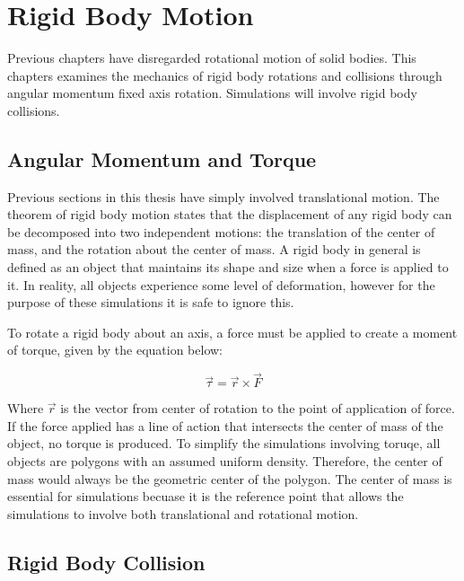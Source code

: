 
\chapter{Rigid Body Motion} %

\label{Chapter3} %



Previous chapters have disregarded rotational motion of solid bodies.  This chapters examines the mechanics of rigid body rotations and collisions through angular momentum fixed axis rotation.  Simulations will involve rigid body collisions.


\section{Angular Momentum and Torque}

Previous sections in this thesis have simply involved translational motion.  The theorem of rigid body motion states that the displacement of any rigid body can be decomposed into two independent motions: the translation of the center of mass, and the rotation about the center of mass.  A rigid body in general is defined as an object that maintains its shape and size when a force is applied to it.  In reality, all objects experience some level of deformation, however for the purpose of these simulations it is safe to ignore this.  

To rotate a rigid body about an axis, a force must be applied to create a moment of torque, given by the equation below:

\begin{equation} \label{eq:torquegeneral}
\vec{\tau} = \vec{r} \times \vec{F}
\end{equation}


Where $\vec{r}$ is the vector from center of rotation to the point of application of force.  If the force applied has a line of action that intersects the center of mass of the object, no torque is produced.  To simplify the simulations involving toruqe, all objects are polygons with an assumed uniform density.  Therefore, the center of mass would always be the geometric center of the polygon.  The center of mass is essential for simulations becuase it is the reference point that allows the simulations to involve both translational and rotational motion.  













\section{Rigid Body Collision}



